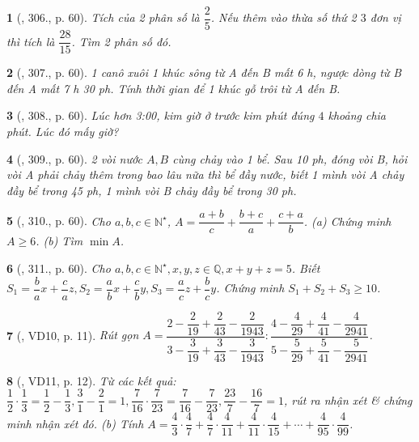 \documentclass{article}
\newtheorem{baitoan}{}
\begin{document}
\begin{baitoan}[\cite{Tuyen_Toan_6}, 306., p. 60]
	Tích của 2 phân số là $\dfrac{2}{5}$. Nếu thêm vào thừa số thứ 2 $3$ đơn vị thì tích là $\dfrac{28}{15}$. Tìm 2 phân số đó.
\end{baitoan}

\begin{baitoan}[\cite{Tuyen_Toan_6}, 307., p. 60]
	1 canô xuôi 1 khúc sông từ A đến B mất {\rm6 h}, ngược dòng từ B đến A mất {\rm7 h 30 ph}. Tính thời gian để 1 khúc gỗ trôi từ A đến B.
\end{baitoan}

\begin{baitoan}[\cite{Tuyen_Toan_6}, 308., p. 60]
	Lúc hơn {\rm3:00}, kim giờ ở trước kim phút đúng $4$ khoảng chia phút. Lúc đó mấy giờ?
\end{baitoan}

\begin{baitoan}[\cite{Tuyen_Toan_6}, 309., p. 60]
	2 vòi nước $A,B$ cùng chảy vào 1 bể. Sau {\rm10 ph}, đóng vòi B, hỏi vòi A phải chảy thêm trong bao lâu nữa thì bể đầy nước, biết 1 mình vòi A chảy đầy bể trong {\rm45 ph}, 1 mình vòi B chảy đầy bể trong {\rm30 ph}.
\end{baitoan}

\begin{baitoan}[\cite{Tuyen_Toan_6}, 310., p. 60]
	Cho $a,b,c\in\mathbb{N}^\star$, $A = \dfrac{a + b}{c} + \dfrac{b + c}{a} + \dfrac{c + a}{b}$. (a) Chứng minh $A\ge6$. (b) Tìm $\min A$.
\end{baitoan}

\begin{baitoan}[\cite{Tuyen_Toan_6}, 311., p. 60]
	Cho $a,b,c\in\mathbb{N}^\star,x,y,z\in\mathbb{Q},x + y + z = 5$. Biết $S_1 = \dfrac{b}{a}x + \dfrac{c}{a}z,S_2 = \dfrac{a}{b}x + \dfrac{c}{b}y,S_3 = \dfrac{a}{c}z + \dfrac{b}{c}y$. Chứng minh $S_1 + S_2 + S_3\ge10$.
\end{baitoan}

\begin{baitoan}[\cite{Binh_Toan_6_tap_2}, VD10, p. 11]
	Rút gọn $A = \dfrac{2 - \dfrac{2}{19} + \dfrac{2}{43} - \dfrac{2}{1943}}{3 - \dfrac{3}{19} + \dfrac{3}{43} - \dfrac{3}{1943}}:\dfrac{4 - \dfrac{4}{29} + \dfrac{4}{41} - \dfrac{4}{2941}}{5 - \dfrac{5}{29} + \dfrac{5}{41} - \dfrac{5}{2941}}$.
\end{baitoan}

\begin{baitoan}[\cite{Binh_Toan_6_tap_2}, VD11, p. 12]
	Từ các kết quả: $\dfrac{1}{2}\cdot\dfrac{1}{3} = \dfrac{1}{2} - \dfrac{1}{3},\dfrac{3}{1} - \dfrac{2}{1} = 1,\dfrac{7}{16}\cdot\dfrac{7}{23} = \dfrac{7}{16} - \dfrac{7}{23},\dfrac{23}{7} - \dfrac{16}{7} = 1$, rút ra nhận xét \& chứng minh nhận xét đó. (b) Tính $A = \dfrac{4}{3}\cdot\dfrac{4}{7} + \dfrac{4}{7}\cdot\dfrac{4}{11} +  \dfrac{4}{11}\cdot\dfrac{4}{15} + \cdots + \dfrac{4}{95}\cdot\dfrac{4}{99}$.
\end{baitoan}
\end{document}
